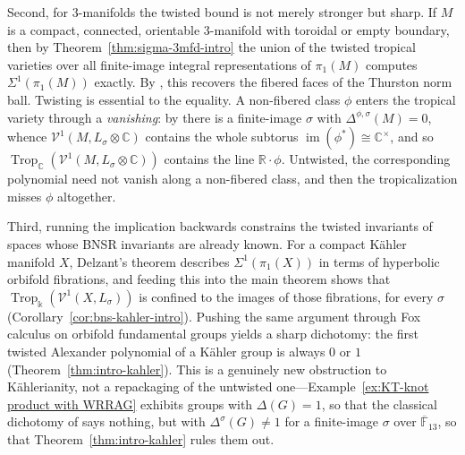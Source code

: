 \documentclass[11pt]{amsart}
\theoremstyle{definition}
\newcommand{\R}{\mathbb{R}}
\newcommand{\C}{\mathbb{C}}
\newcommand{\F}{\mathbb{F}}
\renewcommand{\k}{\Bbbk}
\newcommand{\VV}{\mathcal{V}}
\DeclareMathOperator{\im}{im}
\DeclareMathOperator{\Trop}{Trop}
\begin{document}
Second, for $3$-manifolds the twisted bound is not merely stronger but
sharp.  If $M$ is a compact, connected, orientable $3$-manifold with
toroidal or empty boundary, then by Theorem~\ref{thm:sigma-3mfd-intro}
the union of the twisted tropical varieties over all finite-image
integral representations of $\pi_1(M)$ computes $\Sigma^1(\pi_1(M))$
exactly.  By \cite[Thm.~E]{BNS}, this recovers the fibered faces of the
Thurston norm ball.  Twisting is essential to the equality.  A
non-fibered class $\phi$ enters the tropical variety through a
\emph{vanishing}: by \cite{FV13} there is a finite-image $\sigma$ with
$\Delta^{\phi,\sigma}(M)=0$, whence $\VV^1(M,L_\sigma\otimes \C)$
contains the whole subtorus $\im(\phi^*)\cong \C^{\times}$, and so
$\Trop_\C(\VV^1(M,L_\sigma\otimes \C))$ contains the line $\R\cdot\phi$.
Untwisted, the corresponding polynomial need not vanish along a
non-fibered class, and then the tropicalization misses $\phi$ altogether.

Third, running the implication backwards constrains the twisted
invariants of spaces whose BNSR invariants are already known.  For a
compact K\"{a}hler manifold $X$, Delzant's theorem \cite{De10} describes
$\Sigma^1(\pi_1(X))$ in terms of hyperbolic orbifold fibrations, and
feeding this into the main theorem shows that
$\Trop_{\k}(\VV^1(X,L_\sigma))$ is confined to the images of those
fibrations, for every $\sigma$
(Corollary~\ref{cor:bns-kahler-intro}).  Pushing the same argument
through Fox calculus on orbifold fundamental groups yields a sharp
dichotomy: the first twisted Alexander polynomial of a K\"{a}hler group
is always $0$ or $1$ (Theorem~\ref{thm:intro-kahler}).  This is a
genuinely new obstruction to K\"{a}hlerianity, not a repackaging of the
untwisted one---Example~\ref{ex:KT-knot product with WRRAG} exhibits
groups with $\Delta(G)=1$, so that the classical dichotomy of
\cite[Thm.~4.3(3)]{DPS-imrn} says nothing, but with
$\Delta^{\sigma}(G)\ne 1$ for a finite-image $\sigma$ over
$\overline{\F}_{13}$, so that Theorem~\ref{thm:intro-kahler} rules them
out.
\end{document}
